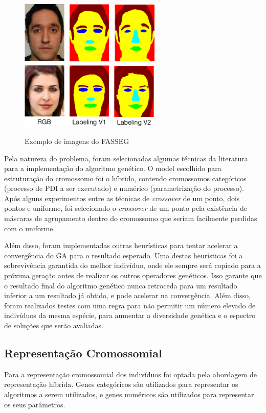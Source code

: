 \documentclass[12pt,oneside,a4paper,english,french,spanish,brazil,]{abntex2}
\begin{document}
\begin{figure}[ht]
\centering
\caption{Exemplo de imagens do FASSEG}
\includegraphics[width=0.6\textwidth]{imagens/FASSEG.png}
\label{fig:FASSEG}
\end{figure}

Pela natureza do problema, foram selecionadas algumas técnicas da literatura para a implementação do algoritmo genético. O model escolhido para estruturação do cromossomo foi o híbrido, contendo cromossomos categóricos (processo de PDI a ser executado) e numérico (parametrização do processo). Após alguns experimentos entre as técnicas de \textit{crossover} de um ponto, dois pontos e uniforme, foi selecionado o \textit{crossover} de um ponto pela existência de máscaras de agrupamento dentro do cromossomo que seriam facilmente perdidas com o uniforme.

Além disso, foram implementadas outras heurísticas para tentar acelerar a convergência do GA para o resultado esperado. Uma destas heurísticas foi a sobrevivência garantida do melhor indivíduo, onde ele sempre será copiado para a próxima geração antes de realizar os outros operadores genéticos. Isso garante que o resultado final do algoritmo genético nunca retroceda para um resultado inferior a um resultado já obtido, e pode acelerar na convergência. Além disso, foram realizados testes com uma regra para não permitir um número elevado de indivíduos da mesma espécie, para aumentar a diversidade genética e o espectro de soluções que serão avaliadas.

\subsection{Representação Cromossomial}

Para a representação cromossomial dos indivíduos foi optada pela abordagem de representação híbrida. Genes categóricos são utilizados para representar os algoritmos a serem utilizados, e genes numéricos são utilizados para representar os seus parâmetros.
\end{document}
